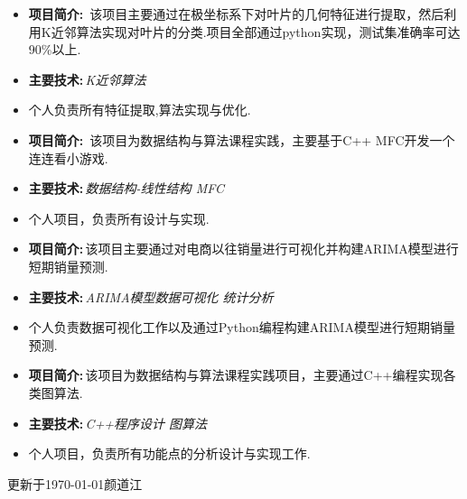 \documentclass[10pt,a4paper,ragged2e]{altacv}
\begin{document}
\divider

\begin{itemize}
\item\textbf{项目简介:\,} 该项目主要通过在极坐标系下对叶片的几何特征进行提取，然后利用K近邻算法实现对叶片的分类.项目全部通过python实现，测试集准确率可达90\%以上.
\item \textbf{主要技术:\,}\emph{K近邻算法}
\item 个人负责所有特征提取,算法实现与优化.
\end{itemize}

\divider

\begin{itemize}
	\item\textbf{项目简介:\,} 该项目为数据结构与算法课程实践，主要基于C++ MFC开发一个连连看小游戏.
	\item \textbf{主要技术:\,}\emph{数据结构-线性结构 \quad MFC}
	\item 个人项目，负责所有设计与实现.
\end{itemize}

\clearpage

\begin{itemize}
\item\textbf{项目简介:\,}该项目主要通过对电商以往销量进行可视化并构建ARIMA模型进行短期销量预测.
\item \textbf{主要技术:\,}\emph{ARIMA模型\quad 数据可视化 \quad 统计分析}
\item 个人负责数据可视化工作以及通过Python编程构建ARIMA模型进行短期销量预测.
\end{itemize}

\divider

\begin{itemize}
\item\textbf{项目简介:\,}该项目为数据结构与算法课程实践项目，主要通过C++编程实现各类图算法.
\item \textbf{主要技术:\,}\emph{C++程序设计 \quad 图算法}
\item 个人项目，负责所有功能点的分析设计与实现工作.
\end{itemize}

\divider





\begin{flushright}
	\tiny{更新于\today \qquad 颜道江}
\end{flushright}

\clearpage
\end{document}
